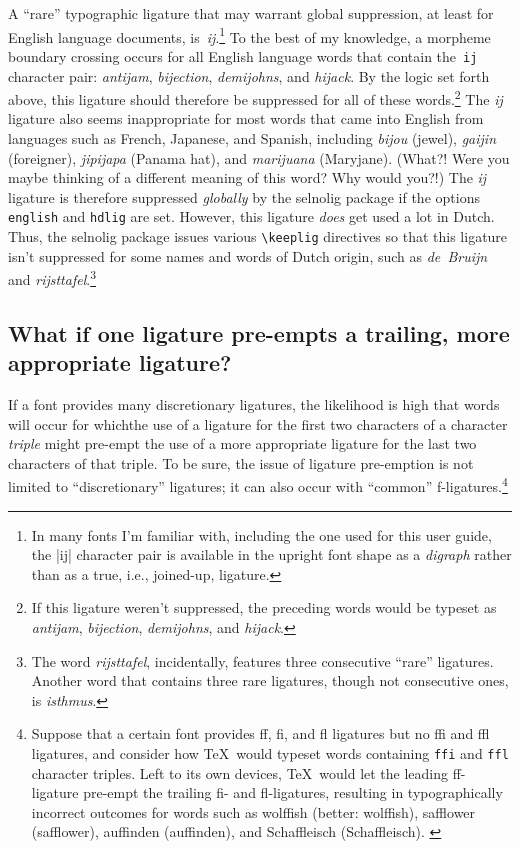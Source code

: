 \documentclass[11pt]{article}
\newcommand{\pkg}[1]{\textsf{#1}}
\newcommand{\opt}[1]{\texttt{#1}}
\newcommand{\cmmd}[1]{\texttt{\textbackslash #1}}
\begin{document}
A \enquote{rare} typographic ligature that may warrant global suppression, at least for English language documents, is~\mbox{\emph{ij}}.\footnote{In many fonts I'm familiar with, including the one used for this user guide, the |ij| character pair is available in the upright font shape as a \emph{digraph} rather than as a true, i.e., joined-up, ligature.} To the best of my knowledge, a morpheme boundary crossing occurs for all English language words that contain the~\opt{ij} character pair: \emph{antijam}, \emph{bijection}, \emph{demijohns}, and \emph{hijack}. By the logic set forth above, this ligature should therefore be suppressed for all of these words.\footnote{If this ligature weren't suppressed, the preceding words would be typeset as \emph{ant\mbox{ij}am}, \emph{b\mbox{ij}ection}, \emph{dem\mbox{ij}ohns}, and \emph{h\mbox{ij}ack}.} The \mbox{\emph{ij}} ligature also seems inappropriate for most words that came into English from languages such as French, Japanese, and Spanish, including \emph{bijou} (jewel), \emph{gaijin} (foreigner), \emph{jipijapa} (Panama hat), and \emph{marijuana} (Maryjane). (What?! Were you maybe thinking of a different meaning of this word? Why would you?!) The \mbox{\emph{ij}} ligature is therefore suppressed \emph{globally} by the \pkg{selnolig} package if the options \opt{english} and \opt{hdlig} are set.
However, this ligature \emph{does} get used a lot in Dutch. Thus, the \pkg{selnolig} package issues various \cmmd{keeplig} directives so that this ligature isn't suppressed for some names and words of Dutch origin, such as \emph{de~Bruijn} and \emph{rijsttafel}.\footnote{The word \emph{rijsttafel}, incidentally, features three consecutive \enquote{rare} ligatures. Another word that contains three rare ligatures, though not consecutive ones, is \emph{\mbox{is}thmus}. }



\subsection{What if one ligature pre-empts a trailing, more appropriate ligature?} \label{sec:preempt}

If a font provides many discretionary ligatures, the likelihood is high that words will occur for whichthe use of a ligature for the first two characters of a character \emph{triple} might pre-empt the use of a more appropriate ligature for the last two characters of that triple. To be sure, the issue of ligature pre-emption is not limited to \enquote{discretionary} ligatures; it can also occur with \enquote{common} f-ligatures.\footnote{Suppose that a certain font provides ff, fi, and fl ligatures but no ffi and ffl ligatures, and consider how \TeX\ would typeset words containing \opt{ffi} and \opt{ffl} character triples. Left to its own devices, \TeX\ would let the leading ff-ligature pre-empt the trailing fi- and fl-ligatures, resulting in typographically incorrect outcomes for words such as wol\mbox{ff}ish (better: wolf\mbox{fi}sh), sa\mbox{ff}lower (safflower), au\mbox{ff}inden (auffinden), and Scha\mbox{ff}leisch (Schaffleisch). \label{fn:triple}} 
\end{document}
